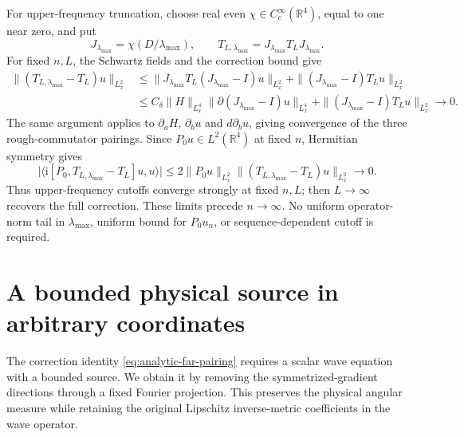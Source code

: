 \documentclass[11pt,a4paper]{article}
\numberwithin{equation}{section}
\newcommand{\R}{\mathbb R}
\newcommand{\ii}{\mathrm{i}}
\theoremstyle{definition}
\begin{document}
For upper-frequency truncation, choose real even $\chi\in C_c^\infty(\R^4)$,
equal to one near zero, and put
\begin{equation*}
J_{\lambda_{\max}}=\chi(D/\lambda_{\max}),\qquad
T_{L,\lambda_{\max}}=J_{\lambda_{\max}}T_LJ_{\lambda_{\max}}.
\end{equation*}
For fixed $n,L$, the Schwartz fields and the correction bound give
\begin{equation*}
\begin{aligned}
\|(T_{L,\lambda_{\max}}-T_L)u\|_{L^2_x}
&\leq\|J_{\lambda_{\max}}T_L(J_{\lambda_{\max}}-I)u\|_{L^2_x}
       +\|(J_{\lambda_{\max}}-I)T_Lu\|_{L^2_x}\\
&\leq C_\delta\|H\|_{L^4_x}
       \|\partial(J_{\lambda_{\max}}-I)u\|_{L^4_x}
       +\|(J_{\lambda_{\max}}-I)T_Lu\|_{L^2_x}
 \longrightarrow0.
\end{aligned}
\end{equation*}
The same argument applies to $\partial_aH$, $\partial_bu$ and
$d\partial_bu$, giving convergence of the three rough-commutator pairings.
Since $P_0u\in L^2(\R^4)$ at fixed $n$, Hermitian symmetry gives
\begin{equation*}
\big|\langle \ii [P_0,T_{L,\lambda_{\max}}-T_L]u,u\rangle\big|
\leq2\|P_0u\|_{L^2_x}
        \|(T_{L,\lambda_{\max}}-T_L)u\|_{L^2_x}
\longrightarrow0.
\end{equation*}
Thus upper-frequency cutoffs converge strongly at fixed $n,L$;
then $L\to\infty$ recovers the full correction. These limits precede
$n\to\infty$. No uniform operator-norm tail in $\lambda_{\max}$,
uniform bound for $P_0u_n$, or sequence-dependent cutoff is required.

\section{A bounded physical source in arbitrary coordinates}\label{sec:general-projection}

The correction identity \eqref{eq:analytic-far-pairing} requires a scalar
wave equation with a bounded source. We obtain it by removing the
symmetrized-gradient directions through a fixed Fourier projection.
This preserves the physical angular measure while retaining the original
Lipschitz inverse-metric coefficients in the wave operator.
\end{document}
